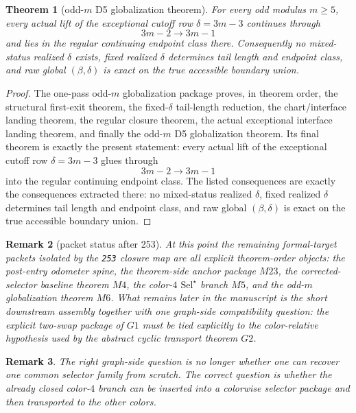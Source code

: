 \documentclass[11pt]{article}
\newtheorem{theorem}{Theorem}[section]
\newtheorem{remark}[theorem]{Remark}
\newcommand{\SelStar}{\mathrm{Sel}^{\star}}
\begin{document}
\begin{theorem}[odd-$m$ D5 globalization theorem]
\label{thm:M6-globalization}
For every odd modulus $m\ge 5$, every actual lift of the exceptional cutoff row
$\delta=3m-3$ continues through
\[
3m-2\to 3m-1
\]
and lies in the regular continuing endpoint class there.
Consequently no mixed-status realized $\delta$ exists, fixed realized $\delta$
determines tail length and endpoint class, and raw global $(\beta,\delta)$ is
exact on the true accessible boundary union.
\end{theorem}

\begin{proof}
The one-pass odd-$m$ globalization package proves, in theorem order, the
structural first-exit theorem, the fixed-\(\delta\) tail-length reduction, the
chart/interface landing theorem, the regular closure theorem, the actual
exceptional interface landing theorem, and finally the odd-$m$ D5 globalization
theorem.
Its final theorem is exactly the present statement: every actual lift of the
exceptional cutoff row \(\delta=3m-3\) glues through
\[
3m-2\to 3m-1
\]
into the regular continuing endpoint class.
The listed consequences are exactly the consequences extracted there: no
mixed-status realized \(\delta\), fixed realized \(\delta\) determines tail
length and endpoint class, and raw global \((\beta,\delta)\) is exact on the
true accessible boundary union.
\end{proof}

\begin{remark}[packet status after 253]
At this point the remaining formal-target packets isolated by the
\texttt{253} closure map are all explicit theorem-order objects:
the post-entry odometer spine, the theorem-side anchor package \(M23\), the
corrected-selector baseline theorem \(M4\), the color-$4$ \(\SelStar\) branch
\(M5\), and the odd-$m$ globalization theorem \(M6\).
What remains later in the manuscript is the short downstream assembly together
with one graph-side compatibility question:
the explicit two-swap package of \(G1\) must be tied explicitly to the
color-relative hypothesis used by the abstract cyclic transport theorem \(G2\).
\end{remark}

\begin{remark}
The right graph-side question is no longer whether one can recover one common
selector family from scratch.
The correct question is whether the already closed color-$4$ branch can be
inserted into a colorwise selector package and then transported to the other
colors.
\end{remark}
\end{document}
